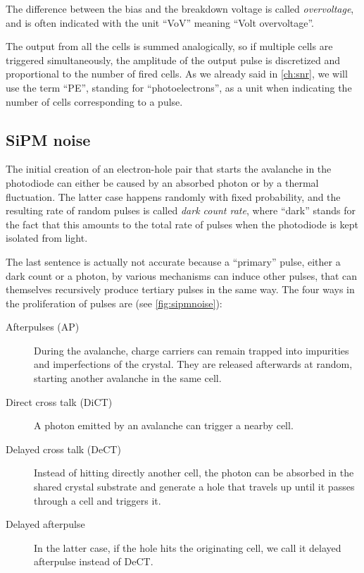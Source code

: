 The difference between the bias and the breakdown voltage is called
\emph{overvoltage}, and is often indicated with the unit ``\si{VoV}'' meaning
``Volt overvoltage''.

The output from all the cells is summed analogically, so if multiple cells are
triggered simultaneously, the amplitude of the output pulse is discretized and
proportional to the number of fired cells. As we already said in
\autoref{ch:snr}, we will use the term ``PE'', standing for ``photoelectrons'',
as a unit when indicating the number of cells corresponding to a pulse.

\subsection{SiPM noise}

The initial creation of an electron-hole pair that starts the avalanche in the
photodiode can either be caused by an absorbed photon or by a thermal
fluctuation. The latter case happens randomly with fixed probability, and the
resulting rate of random pulses is called \emph{dark count rate}, where
``dark'' stands for the fact that this amounts to the total rate of pulses when
the photodiode is kept isolated from light.

The last sentence is actually not accurate because a ``primary'' pulse, either
a dark count or a photon, by various mechanisms can induce other pulses, that
can themselves recursively produce tertiary pulses in the same way. The four
ways in the proliferation of pulses are (see \autoref{fig:sipmnoise}):

\begin{description}

    \item[Afterpulses (AP)] During the avalanche, charge carriers can remain
    trapped into impurities and imperfections of the crystal. They are released
    afterwards at random, starting another avalanche in the same cell.
    
    \item[Direct cross talk (DiCT)] A photon emitted by an avalanche can
    trigger a nearby cell.
    
    \item[Delayed cross talk (DeCT)] Instead of hitting directly another cell,
    the photon can be absorbed in the shared crystal substrate and generate
    a hole that travels up until it passes through a cell and triggers it.
    
    \item[Delayed afterpulse] In the latter case, if the hole hits the
    originating cell, we call it delayed afterpulse instead of DeCT.

\end{description}

